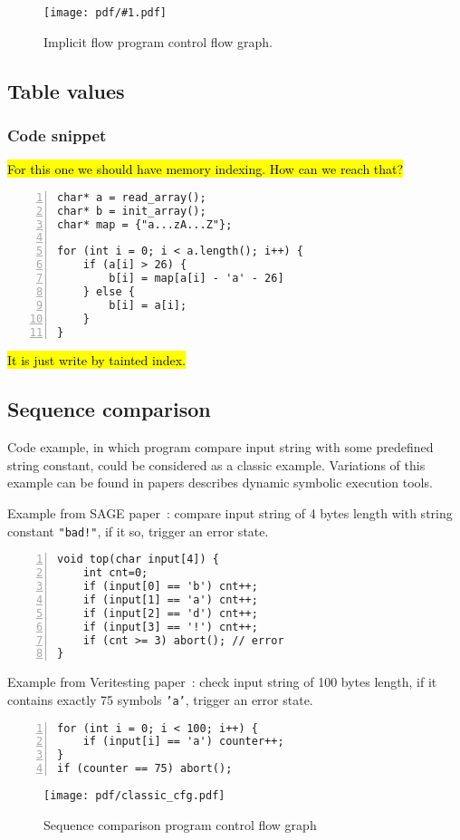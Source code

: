 \documentclass[oneside,a4]{article}  %
\newcommand{\sublevel}{\subsection}
\newcommand{\subsublevel}{\subsubsection}
\newcommand{\comment}[1]{\hl{#1}}
\newcommand{\centerimage}[2]{
\begin{figure}[h!]
    \begin{center}
        \texttt{[image: pdf/\#1.pdf]}
        \caption{#2}
    \end{center}
    \label{img:#1}
\end{figure}
}
\begin{document}
\centerimage{implicit}
    {Implicit flow program control flow graph.}

\sublevel{Table values}

\subsublevel*{Code snippet}

 \comment{For this one we should have memory indexing.
How can we reach that?}

\begin{lstlisting}[numbers=left,numberstyle=\scriptsize]
char* a = read_array();
char* b = init_array();
char* map = {"a...zA...Z"};

for (int i = 0; i < a.length(); i++) {
    if (a[i] > 26) {
        b[i] = map[a[i] - 'a' - 26]
    } else {
        b[i] = a[i];
    }
}
\end{lstlisting}

 \comment{It is just write by tainted index.}

\sublevel{Sequence comparison}

Code example, in which program compare input string with some
predefined string constant, could be considered as a classic example.
Variations of this example can be found in papers describes
dynamic symbolic execution tools.

Example from SAGE paper~\cite{sage}: compare input string of 4 bytes length
with string constant \texttt{"bad!"}, if it so, trigger an error state.
\begin{lstlisting}[numbers=left,numberstyle=\scriptsize]
void top(char input[4]) {
    int cnt=0;
    if (input[0] == 'b') cnt++;
    if (input[1] == 'a') cnt++;
    if (input[2] == 'd') cnt++;
    if (input[3] == '!') cnt++;
    if (cnt >= 3) abort(); // error
}
\end{lstlisting}

Example from Veritesting paper~\cite{veritesting}: check input string of
100 bytes length, if it contains exactly 75 symbols \texttt{'a'},
trigger an error state.
\begin{lstlisting}[numbers=left,numberstyle=\scriptsize]
for (int i = 0; i < 100; i++) {
    if (input[i] == 'a') counter++;
}
if (counter == 75) abort();
\end{lstlisting}

\begin{wrapfigure}{r}{5cm}
\begin{center}
\texttt{[image: pdf/classic\_cfg.pdf]}
\end{center}
\caption{Sequence comparison program control flow graph}
\end{wrapfigure}
\end{document}
